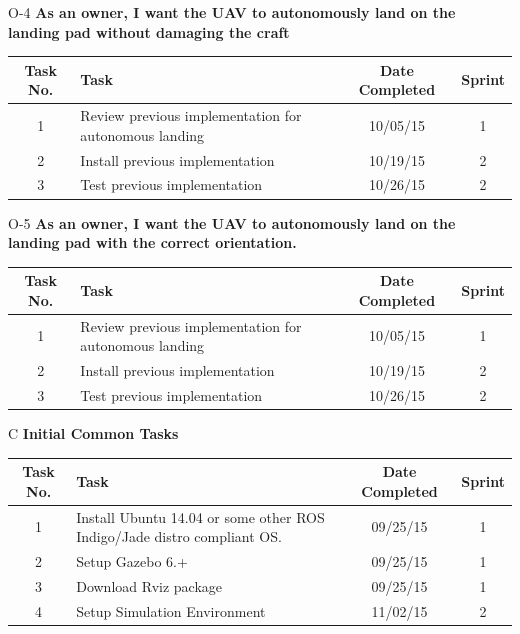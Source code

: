 \documentclass[11pt]{beamer}
\begin{document}
\begin{frame}{O-4}
\textbf{As an owner, I want the UAV to autonomously land on the landing pad without damaging the craft}
\begin{tabular}{| c | >{\raggedright}m{4cm} | c | c |}\hline
Task No. & Task & Date Completed & Sprint\\\hline
1 & Review previous implementation for autonomous landing & 10/05/15 & 1 \\\hline
2 & Install previous implementation & 10/19/15 & 2 \\\hline
3 & Test previous implementation & 10/26/15 & 2\\\hline
\end{tabular}
\end{frame}


\begin{frame}{O-5}
\textbf{As an owner, I want the UAV to autonomously land on the landing pad with the correct orientation.}
\begin{tabular}{| c | >{\raggedright}m{4cm} | c | c |}\hline
Task No. & Task & Date Completed & Sprint\\\hline
1 & Review previous implementation for autonomous landing & 10/05/15 & 1 \\\hline
2 & Install previous implementation & 10/19/15 & 2 \\\hline
3 & Test previous implementation & 10/26/15 & 2\\\hline
\end{tabular}
\end{frame}


\begin{frame}{C}
\textbf{Initial Common Tasks}
\begin{tabular}{| c | >{\raggedright}m{4cm} | c | c |}\hline
Task No. & Task & Date Completed & Sprint\\\hline
1 & Install Ubuntu 14.04 or some other ROS Indigo/Jade distro compliant OS. & 09/25/15 & 1 \\\hline
2 & Setup Gazebo 6.+ & 09/25/15 & 1 \\\hline
3 & Download Rviz package & 09/25/15 & 1\\\hline
4 & Setup Simulation Environment & 11/02/15 & 2 \\\hline
\end{tabular}
\end{frame}
\end{document}
